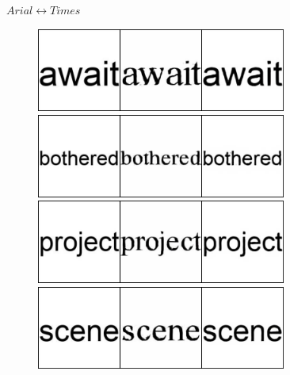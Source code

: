 \documentclass[10pt,twocolumn,letterpaper]{article}
\begin{document}
\begin{figure}[!htb]
     \caption{$Arial \leftrightarrow Times$}
     \label{fig:arial22times}
\end{figure} 

\begin{figure}[!htb]
     \centering
     \begin{subfigure}[]{0.49\textwidth}
         \centering
         \includegraphics[width=0.9\textwidth]{test_a_2_b_31}\\
         \vspace{0.3cm}
		 \includegraphics[width=0.9\textwidth]{test_a_2_b_55}\\
		 \vspace{0.3cm}
		 \includegraphics[width=0.9\textwidth]{test_a_2_b_341}\\
		 \vspace{0.3cm}
		 \includegraphics[width=0.9\textwidth]{test_a_2_b_385}\\

\end{subfigure}
\end{figure}
\end{document}
